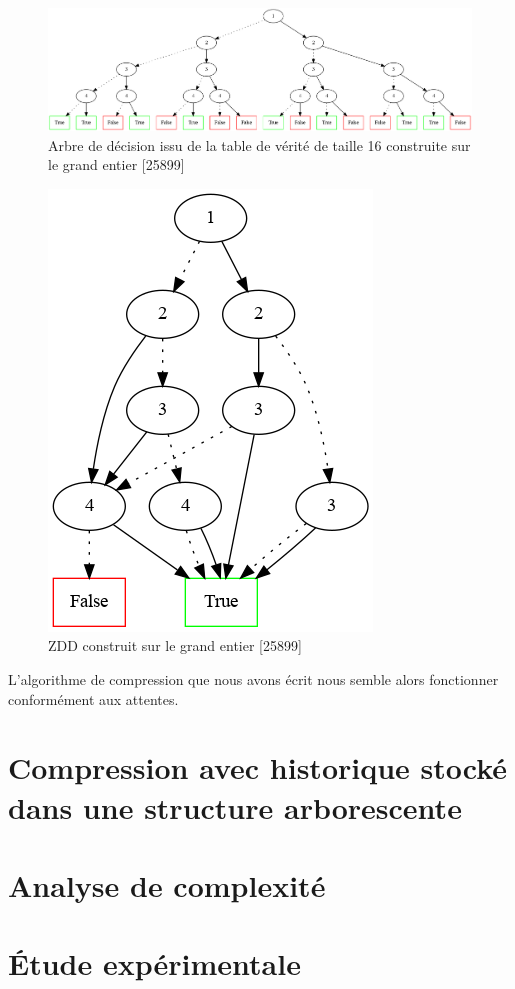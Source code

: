 \documentclass[12pt,a4paper]{article}
\begin{document}
\begin{figure}[hbtp]
\centering
\includegraphics[scale=0.3]{../Images/arbre_non_compresse.png} 
\caption{Arbre de décision issu de la table de vérité de taille 16 construite sur le grand entier [25899]}
\end{figure}



\begin{figure}[hbtp]
\centering
\includegraphics[scale=0.3]{../Images/arbre_compresse.png}
\caption{ZDD construit sur le grand entier [25899]}
\end{figure}

L'algorithme de compression que nous avons écrit nous semble alors fonctionner conformément aux attentes.

\section{Compression avec historique stocké dans une structure arborescente}

\section{Analyse de complexité}


\section{Étude expérimentale}
\end{document}
